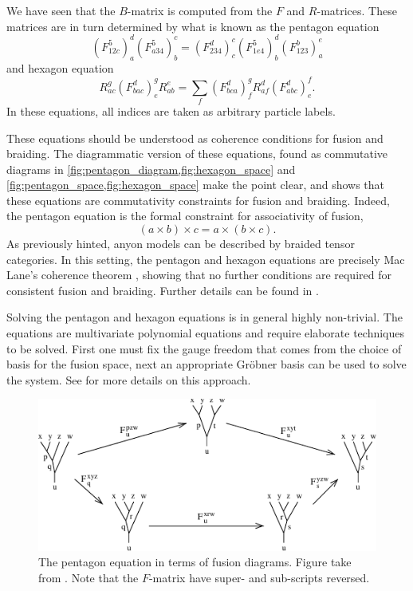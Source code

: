 We have seen that the $B$-matrix is computed from the $F$ and $R$-matrices. These matrices are in turn determined by what is known as the pentagon equation
\begin{equation}\label{eq:pentagon}
  \left(F_{12c}^5\right)^d_a \left(F_{a34}^5\right)^c_b = \left(F_{234}^d\right)_c^c \left( F_{1e4}^5 \right)^d_b \left( F_{123}^b \right)^e_a
\end{equation}
and hexagon equation
\begin{equation}\label{eq:hexagon}
  R_{ac}^g \left(F_{bac}^d\right)^g_e R_{ab}^e = \sum_{f} \left(F_{bca}^d\right)^g_f R_{af}^d \left(F_{abc}^d\right)^f_e.
\end{equation}
In these equations, all indices are taken as arbitrary particle labels.

These equations should be understood as coherence conditions for fusion and braiding. The diagrammatic version of these equations, found as commutative diagrams in \cref{fig:pentagon_diagram,fig:hexagon_space} and \cref{fig:pentagon_space,fig:hexagon_space} make the point clear, and shows that these equations are commutativity constraints for fusion and braiding. Indeed, the pentagon equation is the formal constraint for associativity of fusion,
\begin{equation}
  (a \times b) \times c = a \times (b \times c).
\end{equation}
As previously hinted, anyon models can be described by braided tensor categories. In this setting, the pentagon and hexagon equations are precisely Mac Lane's coherence theorem \cite{mac lane}, showing that no further conditions are required for consistent fusion and braiding. Further details can be found in \cite{kitaev,preskill}.

Solving the pentagon and hexagon equations is in general highly non-trivial. The equations are multivariate polynomial equations and require elaborate techniques to be solved. First one must fix the gauge freedom that comes from the choice of basis for the fusion space, next an appropriate Gröbner basis can be used to solve the system. See \cite{bonderson} for more details on this approach.

\begin{figure}[!htb]
  \centering
  \includegraphics[width=1\linewidth]{img/pentagon_diagram.pdf}
  \caption{The pentagon equation in terms of fusion diagrams. Figure take from \cite{kitaev}. Note that the $F$-matrix have super- and sub-scripts reversed.}
  \label{fig:pentagon_diagram}
\end{figure}

